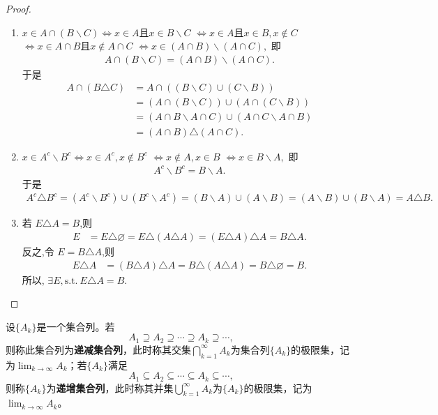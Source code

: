 \documentclass[../../main.tex]{subfiles}%
\begin{document}
\begin{proof}
\begin{enumerate}[(1)]
\item $x\in A\cap(B\backslash C)\Leftrightarrow x\in A \text{且} x\in B\backslash C$
$\Leftrightarrow x\in A \text{且} x\in B,x\notin C$
$\Leftrightarrow x\in A\cap B \text{且} x\notin A\cap C$
$\Leftrightarrow x\in (A\cap B)\backslash (A\cap C),$
即
\begin{align*}
A \cap (B \backslash  C) = (A \cap B) \backslash  (A \cap C).
\end{align*}
于是
\begin{align*}
A \cap (B\triangle C) &= A \cap ((B \backslash  C) \cup (C \backslash  B)) \\
&=(A \cap (B \backslash  C)) \cup (A \cap (C \backslash  B)) \\
&=(A \cap B \backslash  A \cap C) \cup (A \cap C \backslash  A \cap B) \\
&=(A \cap B)\triangle(A \cap C).
\end{align*}

\item $x\in A^c \backslash  B^c \Leftrightarrow x\in A^c,x\notin B^c$
$\Leftrightarrow x\notin A,x\in B$
$\Leftrightarrow x\in B \backslash  A,$
即
\begin{align*}
A^c \backslash  B^c = B \backslash  A.
\end{align*}
于是
\begin{align*}
A^c\triangle B^c = (A^c \backslash  B^c) \cup (B^c \backslash  A^c) 
= (B \backslash  A) \cup (A \backslash  B) = (A \backslash  B) \cup (B \backslash  A) = A\triangle B.
\end{align*}


\item 若 $E\triangle A = B$,则
\begin{align*}
E &= E\triangle \varnothing = E\triangle (A\triangle A) = (E\triangle A)\triangle A = B\triangle A.
\end{align*}
反之,令 $E = B\triangle A$,则
\begin{align*}
E\triangle A &= (B\triangle A)\triangle A = B\triangle (A\triangle A) = B\triangle \varnothing = B.
\end{align*}
所以, $\exists E,\text{s.t.}\ E\triangle A = B.$
\end{enumerate}
\end{proof}

\begin{definition}[递增、递减集合列]\label{definition:递增、递减集合列}
设\(\{A_k\}\)是一个集合列。若
\[A_1\supseteq A_2\supseteq\cdots\supseteq A_k\supseteq\cdots,\]
则称此集合列为\textbf{递减集合列}，此时称其交集\(\bigcap_{k = 1}^{\infty}A_k\)为集合列\(\{A_k\}\)的极限集，记为\(\lim_{k\rightarrow\infty}A_k\)；若\(\{A_k\}\)满足
\[A_1\subseteq A_2\subseteq\cdots\subseteq A_k\subseteq\cdots,\]
则称\(\{A_k\}\)为\textbf{递增集合列}，此时称其并集\(\bigcup_{k = 1}^{\infty}A_k\)为\(\{A_k\}\)的极限集，记为\(\lim_{k\rightarrow\infty}A_k\)。
\end{definition}
\end{document}
